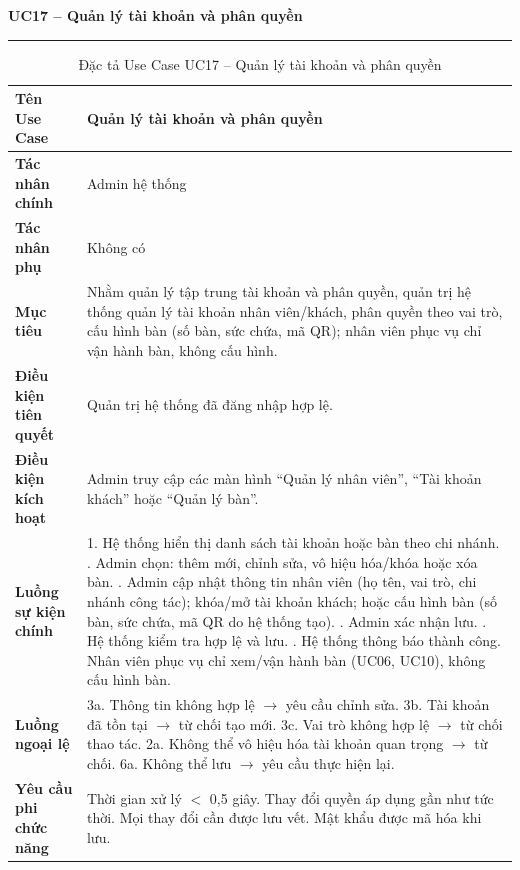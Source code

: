 ﻿\documentclass[../DoAn.tex]{subfiles}
\newcommand{\UCtitle}[1]{%
    \vspace{0.5em}
    {\large\bfseries #1}\\[-0.5em]
    \rule{\textwidth}{0.5pt}
    \vspace{0.3em}
}
\begin{document}
\begin{table}[H]
\UCtitle{UC17 – Quản lý tài khoản và phân quyền}
\centering
\small
\begin{tabular}{|p{4cm}|p{10.2cm}|}
\hline
\textbf{Tên Use Case} & Quản lý tài khoản và phân quyền \\ \hline
\textbf{Tác nhân chính} & Admin hệ thống \\ \hline
\textbf{Tác nhân phụ} & Không có \\ \hline
\textbf{Mục tiêu} &
Nhằm quản lý tập trung tài khoản và phân quyền, quản trị hệ thống quản lý tài khoản nhân viên/khách, phân quyền theo vai trò, cấu hình bàn (số bàn, sức chứa, mã QR); nhân viên phục vụ chỉ vận hành bàn, không cấu hình.
\\ \hline
\textbf{Điều kiện tiên quyết} & Quản trị hệ thống đã đăng nhập hợp lệ. \\ \hline
\textbf{Điều kiện kích hoạt} &
Admin truy cập các màn hình ``Quản lý nhân viên'', ``Tài khoản khách'' hoặc ``Quản lý bàn''.
\\ \hline
\textbf{Luồng sự kiện chính} &
1. Hệ thống hiển thị danh sách tài khoản hoặc bàn theo chi nhánh. \newline
2. Admin chọn: thêm mới, chỉnh sửa, vô hiệu hóa/khóa hoặc xóa bàn. \newline
3. Admin cập nhật thông tin nhân viên (họ tên, vai trò, chi nhánh công tác); khóa/mở tài khoản khách; hoặc cấu hình bàn (số bàn, sức chứa, mã QR do hệ thống tạo). \newline
4. Admin xác nhận lưu. \newline
5. Hệ thống kiểm tra hợp lệ và lưu. \newline
6. Hệ thống thông báo thành công. Nhân viên phục vụ chỉ xem/vận hành bàn (UC06, UC10), không cấu hình bàn.
\\ \hline
\textbf{Luồng ngoại lệ} &
3a. Thông tin không hợp lệ $\rightarrow$ yêu cầu chỉnh sửa. \newline
3b. Tài khoản đã tồn tại $\rightarrow$ từ chối tạo mới. \newline
3c. Vai trò không hợp lệ $\rightarrow$ từ chối thao tác. \newline
2a. Không thể vô hiệu hóa tài khoản quan trọng $\rightarrow$ từ chối. \newline
6a. Không thể lưu $\rightarrow$ yêu cầu thực hiện lại.
\\ \hline
\textbf{Yêu cầu phi chức năng} &
Thời gian xử lý $<$ 0,5 giây. Thay đổi quyền áp dụng gần như tức thời. Mọi thay đổi cần được lưu vết. Mật khẩu được mã hóa khi lưu.
\\ \hline
\end{tabular}
\caption{Đặc tả Use Case UC17 – Quản lý tài khoản và phân quyền}
\end{table}
\end{document}
